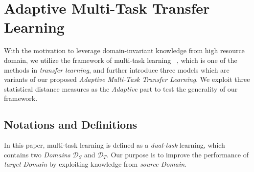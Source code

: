 \section{Adaptive Multi-Task Transfer Learning}\label{sec:multi-cws}



With the motivation to leverage domain-invariant knowledge from high resource domain, we utilize the framework of multi-task learning ~\cite{Caruana1997}, which is one of the methods in \textit{transfer learning}, and further introduce three models which are variants of our proposed \textit{Adaptive Multi-Task Transfer Learning}. We exploit three statistical distance measures as the \textit{Adaptive} part to test the generality of our framework.

\subsection{Notations and Definitions}


In this paper, multi-task learning is defined as a \textit{dual-task} learning, which contains two \textit{Domains} $\mathcal{D}_S$ and $\mathcal{D}_T$. Our purpose is to improve the performance of \textit{target Domain} by exploiting knowledge from \textit{source Domain}. 

